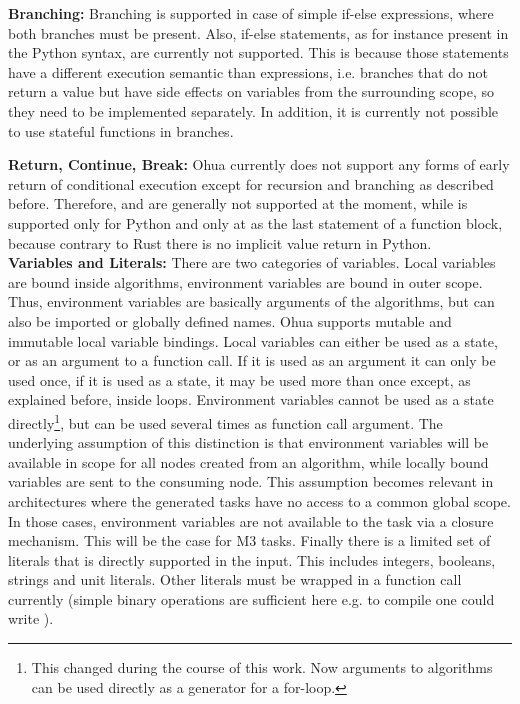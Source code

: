 \textbf{Branching:} Branching is supported in case of simple if-else expressions, where both branches must be present. Also, if-else statements, as for instance present in the Python syntax, are currently not supported. This is because those statements have a different execution semantic than expressions, i.e. branches that do not return a value but have side effects on variables from the surrounding scope, so they need to be implemented separately. In addition, it is currently not possible to use stateful functions in branches.

\textbf{Return, Continue, Break:} Ohua currently does not support any forms of early return of conditional execution except for recursion and branching as described before. Therefore,  and  are generally not supported at the moment, while  is supported only for Python and only at as the last statement of a function block, because contrary to Rust there is no implicit value return in Python. \\

\textbf{Variables and Literals:} There are two categories of variables. Local variables are bound inside algorithms, environment variables are bound in outer scope. Thus, environment variables are basically arguments of the algorithms, but can also be imported or globally defined names. Ohua supports mutable and immutable local variable bindings. Local variables can either be used as a state, or as an argument to a function call. If it is used as an argument it can only be used once, if it is used as a state, it may be used more than once except, as explained before, inside loops. Environment variables cannot be used as a state directly\footnote{This changed during the course of this work. Now arguments to algorithms can be used directly as a generator for a for-loop.}, but can be used several times as function call argument. The underlying assumption of this distinction is that environment variables will be available in scope for all nodes created from an algorithm, while locally bound variables are sent to the consuming node. This assumption becomes relevant in architectures where the generated tasks have no access to a common global scope. In those cases, environment variables are not available to the task via a closure mechanism. This will be the case for M3 tasks. 
Finally there is a limited set of literals that is directly supported in the input. This includes integers, booleans, strings and unit literals. Other literals must be wrapped in a function call currently (simple binary operations are sufficient here e.g. to compile  one could write ).

